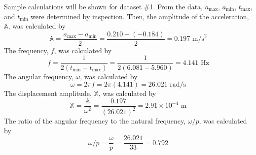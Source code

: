 Sample calculations will be shown for dataset \#1. From the data, $a_{\text{max}}$, $a_{\text{min}}$, $t_{\text{max}}$, and $t_{\text{min}}$ were determined by inspection. Then, the amplitude of the acceleration, $\mathbb{A}$, was calculated by
\begin{equation*}
    \mathbb{A} = \frac{a_{\text{max}} - a_{\text{min}}}{2} = \frac{0.210 - (-0.184)}{2} = 0.197 \text{ m/s}^2
\end{equation*}
The frequency, $f$, was calculated by
\begin{equation*}
    f = \frac{1}{2(t_{\text{min}} - t_{\text{max}})} = \frac{1}{2(6.081 - 5.960)} = 4.141 \text{ Hz}
\end{equation*}
The angular frequency, $\omega$, was calculated by
\begin{equation*}
    \omega = 2\pi f = 2\pi(4.141) = 26.021 \text{ rad/s}
\end{equation*}
The displacement amplitude, $\mathbb{X}$, was calculated by
\begin{equation*}
    \mathbb{X} = \frac{\mathbb{A}}{\omega^2} = \frac{0.197}{(26.021)^2} = 2.91 \times 10^{-4} \text{ m}
\end{equation*}
The ratio of the angular frequency to the natural frequency, $\omega/p$, was calculated by
\begin{equation*}
    \omega/p = \frac{\omega}{p} = \frac{26.021}{33} = 0.792
\end{equation*}

